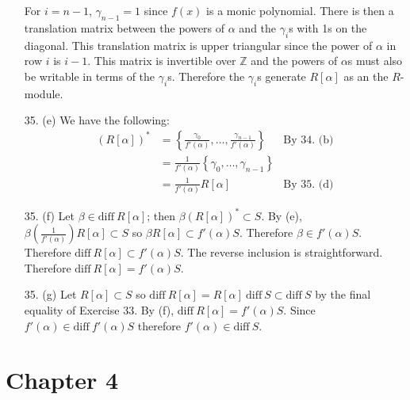 \documentclass{article}
\newcommand{\Z}[0]{\mathbb{Z}}
\newcommand{\diff}[1]{\text{diff}\ #1}
\begin{document}
\begin{enumerate}
For $i = n - 1$, $\gamma_{n-1} = 1$ since $f(x)$ is a monic polynomial.   There is then a translation matrix between the powers of $\alpha$ and the $\gamma_i$s with 1s on the diagonal.  This translation matrix is upper triangular since the power of $\alpha$ in row $i$ is $i - 1$.  This matrix is invertible over $\Z$ and the powers of $\alpha$s must also be writable in terms of the $\gamma_i$s.  Therefore the $\gamma_i$s generate $R[\alpha]$ as an the $R$-module.

\item[35. (e)] We have the following: \begin{align*}(R[\alpha])^{*} &= \left\{ \frac{\gamma_0}{f'(\alpha)}, \ldots, \frac{\gamma_{n-1}}{f'(\alpha)}\right\} & \text{By 34. (b)} \\ &= \frac{1}{f'(\alpha)}\left\{ \gamma_0, \ldots, \gamma_{n-1}\right\}\\ &= \frac{1}{f'(\alpha)}R[\alpha] & \text{By 35. (d)} \end{align*}

\item[35. (f)] Let $\beta \in \diff R[\alpha]$; then $\beta (R[\alpha])^{*} \subset S$.  By (e), $\beta(\frac{1}{f'(\alpha)})R[\alpha] \subset S$ so $\beta R[\alpha] \subset f'(\alpha)S$.  Therefore $\beta \in f'(\alpha)S$.  Therefore $\diff R[\alpha] \subset f'(\alpha)S$.  The reverse inclusion is straightforward.  Therefore $\diff R[\alpha] = f'(\alpha)S$.

\item[35. (g)] Let $R[\alpha] \subset S$ so $\diff R[\alpha] = R[\alpha]\ \diff S \subset \diff S$ by the final equality of Exercise 33.  By (f), $\diff R[\alpha] = f'(\alpha) S$.  Since $f'(\alpha) \in \diff f'(\alpha)S$ therefore $f'(\alpha)\in \diff S$.
\end{enumerate}


\section*{Chapter 4}
\end{document}
